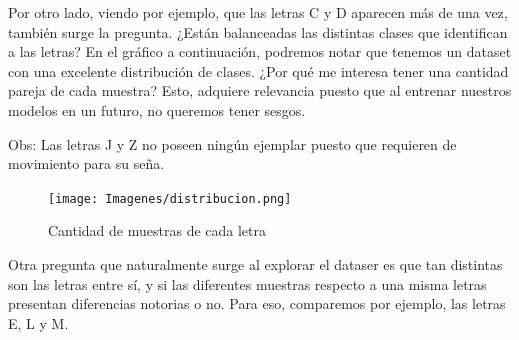 \documentclass[10pt,a4paper]{article}
\begin{document}
Por otro lado, viendo por ejemplo, que las letras C y D aparecen más de una vez, también surge la pregunta. ¿Están balanceadas las distintas clases que identifican a las letras? En el gráfico a continuación, podremos notar que tenemos un dataset con una excelente distribución de clases. ¿Por qué me interesa
tener una cantidad pareja de cada muestra? Esto, adquiere relevancia puesto que al entrenar nuestros modelos en un futuro, no queremos tener sesgos.
\vspace{0.05cm}
  
Obs: Las letras J y Z no poseen ningún ejemplar puesto que requieren de movimiento para su seña.

\vspace{0.1cm}

\begin{figure}[h]
  \centering
  \texttt{[image: Imagenes/distribucion.png]}
  \caption{Cantidad de muestras de cada letra}
  \label{fig:Tabla 1}
\end{figure}

\newpage

Otra pregunta que naturalmente surge al explorar el dataser es que tan distintas son las letras entre sí, y si las diferentes muestras respecto a una misma letras
presentan diferencias notorias o no. Para eso, comparemos por ejemplo, las letras E, L y M.
\end{document}
